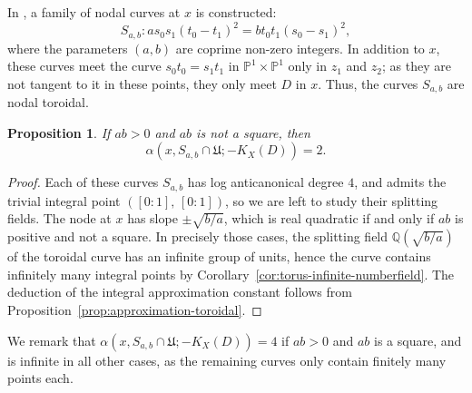 \documentclass[a4paper, twoside, 11pt]{amsart}
\newtheorem{proposition}[theorem]{Proposition}
\theoremstyle{definition}
\newcommand{\mU}{\mathfrak{U}}
\newcommand{\PP}{\mathbb{P}}
\newcommand{\QQ}{\mathbb{Q}}
\begin{document}
In \cite[\S5.2.2]{HuangAA}, a family of nodal curves at $x$ is constructed:
\begin{equation}\label{eq:nodal}
   S_{a,b}\colon as_0s_1(t_0-t_1)^2=b t_0t_1(s_0-s_1)^2,
\end{equation}
where the parameters $(a,b)$ are coprime non-zero integers.
In addition to $x$, these curves meet the curve $s_0t_0=s_1t_1$ in $\PP^1\times \PP^1$ only in $z_1$ and $z_2$; as they are not tangent to it in these points, they only meet $D$ in $x$. Thus, the curves $S_{a,b}$ are nodal toroidal. 
\begin{proposition}\label{prop:sab}
    If $ab>0$ and $ab$ is not a square, then
	\begin{equation*}
	\alpha(x,S_{a,b}\cap \mU;-K_X(D))=2.
	\end{equation*}
\end{proposition} 
\begin{proof}

    Each of these curves $S_{a,b}$ has log anticanonical degree $4$, and admits the trivial integral point $([0:1],\,[0:1])$, so we are left to study their splitting fields. The node at $x$ has slope $\pm\sqrt{b/a}$, which is real quadratic if and only if $ab$ is positive and not a square.  In precisely those cases, the splitting field $\QQ(\sqrt{b/a})$ of the toroidal curve has an infinite group of units, hence the curve contains infinitely many integral points by Corollary~\ref{cor:torus-infinite-numberfield}. The deduction of the integral approximation constant follows from Proposition~\ref{prop:approximation-toroidal}.
\end{proof}
We remark that $\alpha(x,S_{a,b}\cap \mU;-K_X(D))=4$ if $ab>0$ and $ab$ is a square, and is infinite in all other cases, as the remaining curves only contain finitely many points each.
\end{document}
